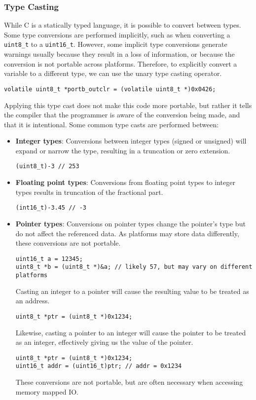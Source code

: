 \documentclass{article}
\begin{document}
\subsubsection{Type Casting}
While C is a statically typed language, it is possible to convert
between types. Some type conversions are performed implicitly, such as
when converting a \texttt{uint8_t} to a
\texttt{uint16_t}. However, some implicit type conversions
generate warnings usually because they result in a loss of information,
or because the conversion is not portable across platforms. Therefore,
to explicitly convert a variable to a different type, we can use the
unary type casting operator.
\begin{verbatim}
volatile uint8_t *portb_outclr = (volatile uint8_t *)0x0426;
\end{verbatim}
Applying this type cast does not make this code more portable, but
rather it tells the compiler that the programmer is aware of the
conversion being made, and that it is intentional. Some common type
casts are performed between:
\begin{itemize}
    \item \textbf{Integer types}: Conversions between integer types
          (signed or unsigned) will expand or narrow the type, resulting in a
          truncation or zero extension.
          \begin{verbatim}
(uint8_t)-3 // 253
\end{verbatim}
    \item \textbf{Floating point types}: Conversions from floating point
          types to integer types results in truncation of the fractional part.
          \begin{verbatim}
(int16_t)-3.45 // -3
\end{verbatim}
    \item \textbf{Pointer types}: Conversions on pointer types change
          the pointer's type but do not affect the referenced data. As
          platforms may store data differently, these conversions are
          not portable.
          \begin{verbatim}
uint16_t a = 12345;
uint8_t *b = (uint8_t *)&a; // likely 57, but may vary on different platforms
\end{verbatim}
          Casting an integer to a pointer will cause the resulting
          value to be treated as an address.
          \begin{verbatim}
uint8_t *ptr = (uint8_t *)0x1234;
\end{verbatim}
          Likewise, casting a pointer to an integer will cause the
          pointer to be treated as an integer, effectively giving us
          the value of the pointer.
          \begin{verbatim}
uint8_t *ptr = (uint8_t *)0x1234;
uint16_t addr = (uint16_t)ptr; // addr = 0x1234
\end{verbatim}
          These conversions are not portable, but are often necessary
          when accessing memory mapped IO\@.
\end{itemize}
\end{document}

